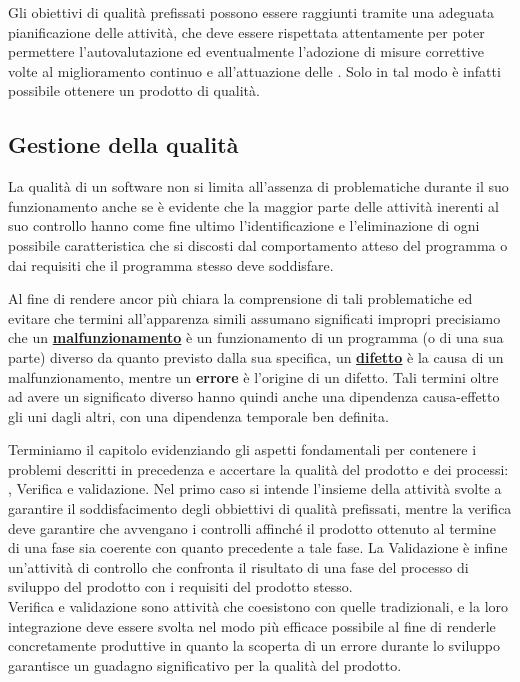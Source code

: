 Gli obiettivi di qualità prefissati possono essere raggiunti tramite una adeguata pianificazione delle attività, che deve essere rispettata attentamente per poter permettere l'autovalutazione ed eventualmente l'adozione di misure correttive volte al miglioramento continuo e all'attuazione delle \underline{}.  Solo in tal modo è infatti possibile ottenere un prodotto di qualità.

\subsection{Gestione della qualità}
La qualità di un software non si limita all'assenza di problematiche durante il suo funzionamento  anche se è evidente che la maggior parte delle attività inerenti al suo controllo hanno come fine ultimo l'identificazione e l'eliminazione di ogni possibile caratteristica che si discosti dal comportamento atteso del programma o dai requisiti che il programma stesso deve soddisfare.

Al fine di rendere ancor più chiara la comprensione di tali problematiche ed evitare che termini all'apparenza simili assumano significati impropri precisiamo che un \underline{\textbf{malfunzionamento}} è un funzionamento di un programma (o di una sua parte) diverso da quanto previsto dalla sua specifica, un \underline{\textbf{difetto}} è la causa di un malfunzionamento, mentre un \textbf{errore} è l'origine di un difetto.
Tali termini oltre ad avere un significato diverso hanno quindi anche una dipendenza causa-effetto gli uni dagli altri, con una dipendenza temporale ben definita.

Terminiamo il capitolo evidenziando gli aspetti fondamentali per contenere i problemi descritti in precedenza e accertare la qualità del prodotto e dei processi: , Verifica e validazione.
Nel primo caso si intende l'insieme della attività svolte a garantire il soddisfacimento degli obbiettivi di qualità prefissati, mentre la verifica deve garantire che avvengano i controlli affinché il prodotto ottenuto al termine di una fase sia coerente con quanto precedente a tale fase. La Validazione è infine un'attività di controllo che confronta il risultato di una fase del processo di sviluppo del prodotto con i requisiti del prodotto stesso.\\

Verifica e validazione sono attività che coesistono con quelle tradizionali, e la loro integrazione deve essere svolta nel modo più efficace possibile al fine di renderle concretamente produttive in quanto la scoperta di un errore durante lo sviluppo garantisce un guadagno significativo per la qualità del prodotto.
\clearpage

